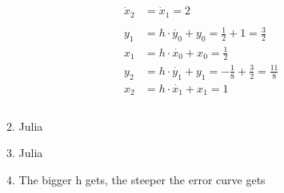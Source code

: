 \documentclass[]{book}
\theoremstyle{definition}
\begin{document}
\begin{enumerate}
\begin{enumerate}
\begin{align*}
            \dot{x}_2 & =  \dot{x}_1 = 2 \\
            \\
            y_1 & = h \cdot \dot{y_0} + y_0 = \frac{1}{2} + 1 = \frac{3}{2}\\
            x_1 & = h \cdot \dot{x_0} + x_0 = \frac{1}{2} \\
            y_2 & = h \cdot \dot{y_1} + y_1 = -\frac{1}{8} + \frac{3}{2} = \frac{11}{8}\\
            x_2 & = h \cdot \dot{x_1} + x_1 = 1 \\
            \\
        \end{align*}
        \item Julia
        \item Julia
        \item The bigger h gets, the steeper the error curve gets
    \end{enumerate}
\end{enumerate}
\end{document}
